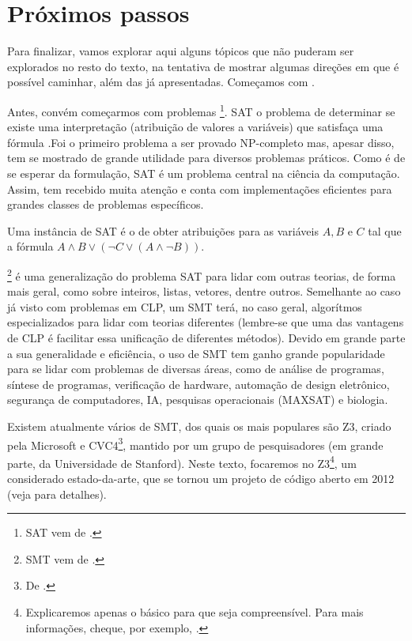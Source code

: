 \documentclass{article}
\begin{document}
\section{Próximos passos}

Para finalizar, vamos explorar aqui alguns tópicos que não puderam ser
explorados no resto do texto, na tentativa de mostrar algumas direções
em que é possível caminhar, além das já apresentadas. Começamos com
.

Antes, convém começarmos com problemas  \footnote{SAT
  vem de .}. SAT o problema de
determinar se existe uma interpretação (atribuição de
valores  a variáveis) que
satisfaça uma fórmula .Foi o primeiro
problema a ser provado NP-completo mas, apesar disso, tem se mostrado
de grande utilidade para diversos problemas práticos. Como é de se
esperar da formulação, SAT é um problema central na ciência da
computação. Assim, tem recebido muita atenção e conta com
implementações eficientes para grandes classes de problemas
específicos.

Uma instância de SAT é o de obter atribuições para as variáveis $A, B$
e $C$ tal que a fórmula $A \wedge B \vee (\neg C \vee (A \wedge \neg B))$.

\footnote{SMT vem de
  .} é uma generalização do
problema SAT para lidar com outras teorias, de forma mais geral, como
sobre inteiros, listas, vetores, dentre outros. Semelhante ao caso já
visto com problemas em CLP, um  SMT terá, no caso
geral, algorítmos especializados para lidar com teorias diferentes
(lembre-se que uma das vantagens de CLP é facilitar essa unificação de
diferentes métodos). Devido em grande parte a sua generalidade e
eficiência, o uso de  SMT tem ganho grande
popularidade para se lidar com problemas de diversas áreas, como de
análise de programas\cite{zheng}, síntese de programas\cite{beyene},
verificação de hardware\cite{kroenig}, automação de design
eletrônico\cite{kroenig}, segurança de computadores\cite{vanegue}, IA,
pesquisas operacionais (MAXSAT)\cite{li} e biologia\cite{yordanov}.

Existem atualmente vários  de SMT, dos quais os mais
populares são Z3, criado pela Microsoft e CVC4\footnote{De
  .}, mantido por um grupo de
pesquisadores (em grande parte, da Universidade de Stanford). Neste
texto, focaremos no Z3\footnote{Explicaremos apenas o básico para que
  seja compreensível. Para mais informações, cheque, por exemplo,
  \cite{z3}.}, um  considerado
estado-da-arte, que se tornou um projeto de código aberto em 2012
(veja \cite{leo} para detalhes).
\end{document}
